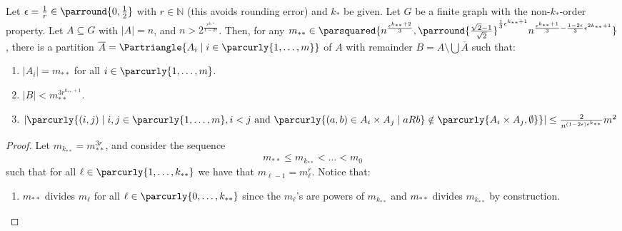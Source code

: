     \begin{theorem}[Theorem 4.16] \label{thm:existance_of_equitative_partition_with_perfect_pairs_but_with_bound_exceptional_pairs}
        Let $\epsilon = \frac{1}{r} \in \parround{0, \frac{1}{2}}$ with $r \in \mathbb{N}$ (this avoids rounding error)
        and $k_*$ be given.
        Let $G$ be a finite graph with the non-$k_*$-order property.
        Let $A \subseteq G$ with $|A| = n$, and $n > 2^{\frac{r^{k_**}}{1-2\epsilon}}$.
        Then, for any $m_{**} \in \parsquared{n^{\frac{\epsilon^{k_{**}+2}}{3}},
        \parround{\frac{\sqrt{2}-1}{\sqrt{2}}}^{\frac{1}{3}\epsilon^{k_{**}+1}} n^{\frac{\epsilon^{k_{**}+1}}{3} -
        \frac{1-2\epsilon}{3}\epsilon^{2k_{**} + 1}}}$, there is a partition
        $\overline{A} = \Partriangle{A_i \mid i \in \parcurly{1, \dots, m}}$ of $A$ with remainder
        $B = A \setminus \bigcup \overline{A}$ such that:
        \begin{enumerate}
            \item\label{itm:existance_of_equitative_partition_with_perfect_pairs_but_with_bound_exceptional_pairs.1}
                $|A_i| = m_{**}$ for all $i \in \parcurly{1, \dots, m}$.
            \item\label{itm:existance_of_equitative_partition_with_perfect_pairs_but_with_bound_exceptional_pairs.2}
                $|B| < m_{**}^{3r^{k_{**}+1}}$.
            \item\label{itm:existance_of_equitative_partition_with_perfect_pairs_but_with_bound_exceptional_pairs.3}
                $|\parcurly{ (i,j) \mid i,j \in \parcurly{1, \dots, m}, i < j \text{ and }
                \parcurly{(a,b) \in A_i \times A_j \mid a R b} \notin
                \parcurly{A_i \times A_j, \emptyset}}|
                \leq \frac{2}{n^{(1-2\epsilon)\epsilon^{k_{**}}}} m^2$
        \end{enumerate}
        \begin{proof}
            Let $m_{k_{**}} = m_{**}^{3r}$, and consider the sequence
            \[
                m_{**} \leq m_{k_{**}} < \dots < m_0
            \]
            such that for all $\ell \in \parcurly{1, \dots, k_{**}}$ we have that $m_{\ell-1} = m_\ell^r$.
            Notice that:
            \begin{enumerate}
                \item $m_{**}$ divides $m_\ell$ for all $\ell \in \parcurly{0, \dots, k_{**}}$ since the $m_\ell$'s are powers of $m_{k_{**}}$
                    and $m_{**}$ divides $m_{k_{**}}$ by construction.

\end{enumerate}
\end{proof}
\end{theorem}
